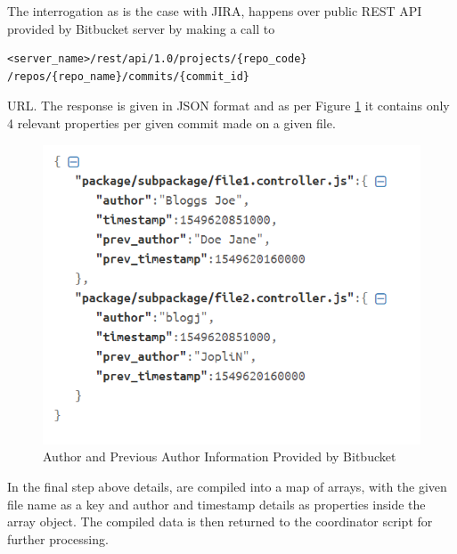 The interrogation as is the case with JIRA, happens over public REST API provided by Bitbucket server by making a call to 
\begin{verbatim}
<server_name>/rest/api/1.0/projects/{repo_code} /repos/{repo_name}/commits/{commit_id}
\end{verbatim} 
URL.
The response is given in JSON format and as per Figure \ref{fig:source-code:bitbucket-prev-commit-response} it contains only 4 relevant properties per given commit made on a given file.

\begin{figure}[!h]
    \centering
    \includegraphics[scale=0.7]{Figures/gatherer/bitbucket_commit_details.PNG}
    \caption{Author and Previous Author Information Provided by Bitbucket}
    \label{fig:source-code:bitbucket-prev-commit-response}
\end{figure}

    
In the final step above details, are compiled into a map of arrays, with the given file name as a key and author and timestamp details as properties inside the array object. The compiled data is then returned to the coordinator script for further processing.
 
